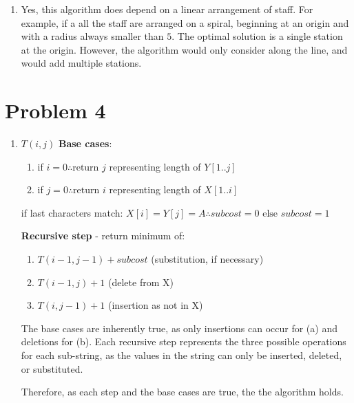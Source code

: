\documentclass{article}
\begin{document}
\begin{enumerate}[label=\alph*)]
    \item Yes, this algorithm does depend on a linear arrangement of staff.
        For example, if a all the staff are arranged on a spiral, beginning at an origin
        and with a  radius always smaller than $5$. The optimal solution is a single station
        at the origin. However, the algorithm would only consider along the line, and would
        add multiple stations.
\end{enumerate}

\section{Problem 4}

\begin{enumerate}
    \item $T(i,j)$
        \textbf{Base cases}:
        \begin{enumerate}
            \item if $i = 0 \therefore \text{return } j $ representing length of $Y[1..j]$
            \item if $j = 0 \therefore \text{return } i $ representing length of $X[1..i]$
        \end{enumerate}

        if last characters match: $X[i] = Y[j] = A \therefore subcost = 0 \text{ else } subcost = 1$

        \textbf{Recursive step} - return minimum of:
        \begin{enumerate}
            \item $T(i-1, j-1) + subcost$ (substitution, if necessary)
            \item $T(i-1, j) + 1$ (delete from X)
            \item $T(i, j-1) + 1$ (insertion as not in X)
        \end{enumerate}
    
        The base cases are inherently true, as only insertions can occur for (a)
        and deletions for (b).
        Each recursive step represents the three possible operations for each sub-string,
        as the values in the string can only be inserted, deleted, or substituted.
        
        Therefore, as each step and the base cases are true, the the algorithm holds.


\end{enumerate}
\end{document}
